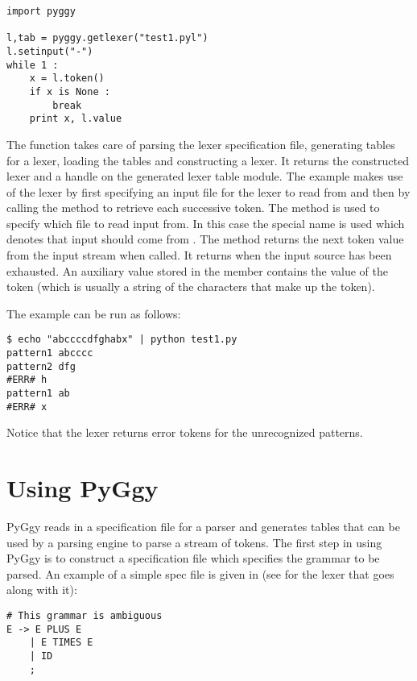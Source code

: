 \begin{verbatim}
import pyggy

l,tab = pyggy.getlexer("test1.pyl")
l.setinput("-")
while 1 :
    x = l.token()
    if x is None :
        break
    print x, l.value
\end{verbatim}

The  function takes care of parsing the lexer specification
file, generating tables for a lexer, loading the tables and constructing
a lexer.  It returns the constructed lexer and a handle on the generated
lexer table module.  The example makes use of the lexer by first specifying
an input file for the lexer to read from and then by calling the
 method to retrieve each successive token.  The 
method is used to specify which file to read input from.  In this case
the special name \file{-} is used which denotes that input should
come from .  The  method returns the next token
value from the input stream when called.  It returns  when
the input source has been exhausted.  An auxiliary value stored in
the  member contains the value of the token (which is usually
a string of the characters that make up the token).

The example can be run as follows:

\begin{verbatim}
$ echo "abccccdfghabx" | python test1.py
pattern1 abcccc
pattern2 dfg
#ERR# h
pattern1 ab
#ERR# x
\end{verbatim}

Notice that the lexer returns error tokens for the unrecognized
patterns.


\section{Using PyGgy}

PyGgy reads in a specification file for a parser and generates
tables that can be used by a parsing engine to parse a stream of
tokens.  The first step in using PyGgy is to construct a specification
file which specifies the grammar to be parsed.  An example of a simple
spec file is given in  (see 
for the lexer that goes along with it):

\begin{verbatim}
# This grammar is ambiguous
E -> E PLUS E
    | E TIMES E
    | ID
    ;
\end{verbatim}

